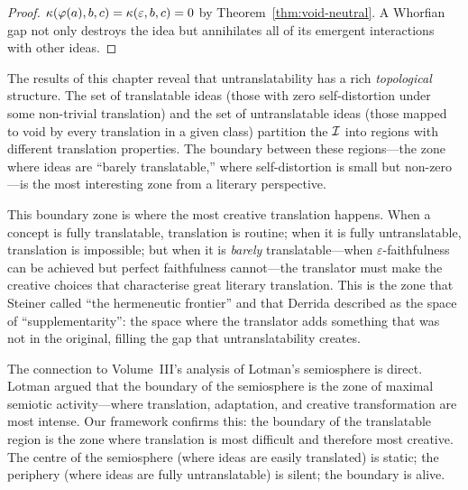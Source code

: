 \begin{proof}
$\kappa(\varphi(a), b, c) = \kappa(\varepsilon, b, c) = 0$ by Theorem~\ref{thm:void-neutral}.  A Whorfian gap not only destroys the idea but annihilates all of its emergent interactions with other ideas.
\end{proof}

\begin{interpretation}
\label{interp:topology-untranslatability}
The results of this chapter reveal that untranslatability has a rich \emph{topological} structure.  The set of translatable ideas (those with zero self-distortion under some non-trivial translation) and the set of untranslatable ideas (those mapped to void by every translation in a given class) partition the $\mathcal{I}$ into regions with different translation properties.  The boundary between these regions---the zone where ideas are ``barely translatable,'' where self-distortion is small but non-zero---is the most interesting zone from a literary perspective.

This boundary zone is where the most creative translation happens.  When a concept is fully translatable, translation is routine; when it is fully untranslatable, translation is impossible; but when it is \emph{barely} translatable---when $\varepsilon$-faithfulness can be achieved but perfect faithfulness cannot---the translator must make the creative choices that characterise great literary translation.  This is the zone that Steiner called ``the hermeneutic frontier'' and that Derrida described as the space of ``supplementarity'': the space where the translator adds something that was not in the original, filling the gap that untranslatability creates.

The connection to Volume~III's analysis of Lotman's semiosphere is direct.  Lotman argued that the boundary of the semiosphere is the zone of maximal semiotic activity---where translation, adaptation, and creative transformation are most intense.  Our framework confirms this: the boundary of the translatable region is the zone where translation is most difficult and therefore most creative.  The centre of the semiosphere (where ideas are easily translated) is static; the periphery (where ideas are fully untranslatable) is silent; the boundary is alive.
\end{interpretation}

